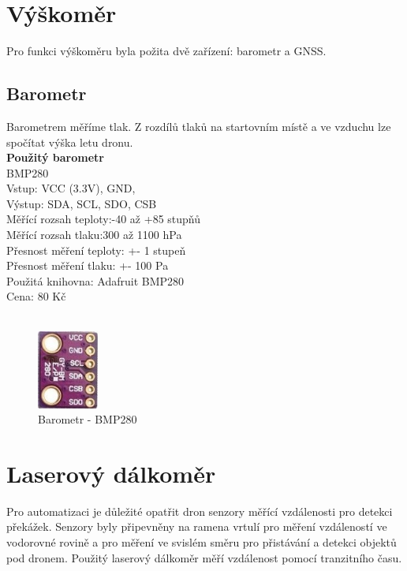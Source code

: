 \section{Výškoměr}
Pro funkci výškoměru byla požita dvě zařízení: barometr a GNSS.\\

\subsection{Barometr}
Barometrem měříme tlak. Z rozdílů tlaků na startovním místě a ve vzduchu lze spočítat výška letu dronu.\\

\textbf{Použitý barometr}\\
BMP280\\
Vstup: VCC (3.3V), GND,\\
Výstup: SDA, SCL, SDO, CSB\\
Měřící rozsah teploty:-40 až +85 stupňů\\
Měřící rozsah tlaku:300 až 1100 hPa\\
Přesnost měření teploty: +- 1 stupeň\\
Přesnost měření tlaku:  +- 100 Pa\\
Použitá knihovna: Adafruit BMP280\\
Cena: 80 Kč\\
\cite{bpm}\\

\begin{figure}[H]
	\centering
	\includegraphics[width=2cm]{pictures/baro.jpg}
	\caption{Barometr - BMP280}
\end{figure}

\section{Laserový dálkoměr}
Pro automatizaci je důležité opatřit dron senzory měřící vzdálenosti pro detekci překážek. Senzory byly připevněny na ramena vrtulí pro měření vzdáleností ve vodorovné rovině a pro měření ve svislém směru pro přistávání a detekci objektů pod dronem. Použitý laserový dálkoměr měří vzdálenost pomocí tranzitního času.\\

